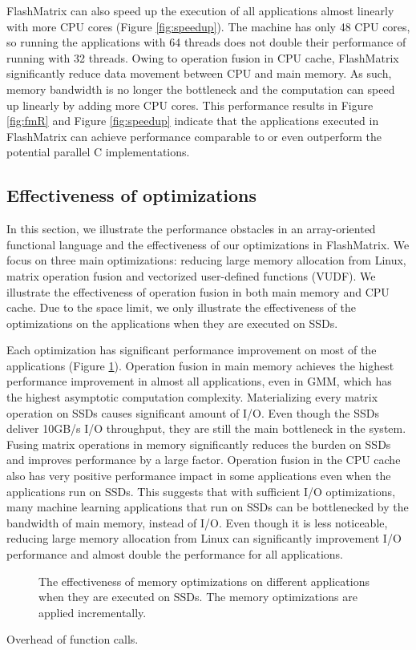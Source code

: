 FlashMatrix can also speed up the execution of all applications almost linearly
with more CPU cores (Figure \ref{fig:speedup}). The machine has only 48 CPU
cores, so running the applications with 64 threads does not double their
performance of running with 32 threads. Owing to operation fusion in CPU cache,
FlashMatrix significantly
reduce data movement between CPU and main memory. As such, memory bandwidth is
no longer the bottleneck and the computation can speed up linearly by adding
more CPU cores. This performance results in Figure \ref{fig:fmR} and Figure
\ref{fig:speedup} indicate that the applications executed in FlashMatrix can
achieve performance comparable to or even outperform the potential parallel
C implementations.

\subsection{Effectiveness of optimizations}

In this section, we illustrate the performance obstacles in an array-oriented
functional language and the effectiveness of our optimizations in FlashMatrix.
We focus on three main optimizations: reducing large memory allocation from
Linux, matrix
operation fusion and vectorized user-defined functions (VUDF). We illustrate
the effectiveness of operation fusion in both main memory and CPU cache.
Due to the space limit, we only illustrate the effectiveness of
the optimizations on the applications when they are executed on SSDs.

Each optimization has significant performance improvement on most of the
applications (Figure \ref{perf:opts}). Operation fusion in main memory achieves
the highest performance improvement in almost all applications, even in GMM,
which has the highest asymptotic computation complexity. Materializing every
matrix operation on SSDs causes significant amount of I/O. Even though the SSDs
deliver 10GB/s I/O throughput, they are still the main bottleneck in the system.
Fusing matrix operations in memory significantly reduces the burden on SSDs and
improves performance by a large factor. Operation fusion in the CPU cache also
has very positive performance impact in some applications even when
the applications run on SSDs. This suggests that with sufficient I/O optimizations,
many machine learning applications that run on SSDs can be bottlenecked by
the bandwidth of main memory, instead of I/O. Even though it is less noticeable,
reducing large memory allocation from Linux can significantly improvement I/O
performance and almost double the performance for all applications.

\begin{figure}
	\begin{center}
		\footnotesize
		
		\caption{The effectiveness of memory optimizations on different applications
			when they are executed on SSDs. The memory optimizations are applied
		incrementally.}
		\label{perf:opts}
	\end{center}
\end{figure}

Overhead of function calls.
